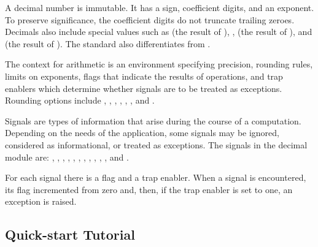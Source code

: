 A decimal number is immutable.  It has a sign, coefficient digits, and an
exponent.  To preserve significance, the coefficient digits do not truncate
trailing zeroes.  Decimals also include special values such as
 (the result of ), ,
(the result of ), and  (the result of
).  The standard also differentiates  from
.
                                                   
The context for arithmetic is an environment specifying precision, rounding
rules, limits on exponents, flags that indicate the results of operations,
and trap enablers which determine whether signals are to be treated as
exceptions.  Rounding options include ,
, , ,
, , and .

Signals are types of information that arise during the course of a
computation.  Depending on the needs of the application, some signals may be
ignored, considered as informational, or treated as exceptions. The signals in
the decimal module are: , ,
, ,
, ,
, , ,
, , and .

For each signal there is a flag and a trap enabler.  When a signal is
encountered, its flag incremented from zero and, then, if the trap enabler
is set to one, an exception is raised.


\begin{seealso}

\end{seealso}



\subsection{Quick-start Tutorial \label{decimal-tutorial}}

